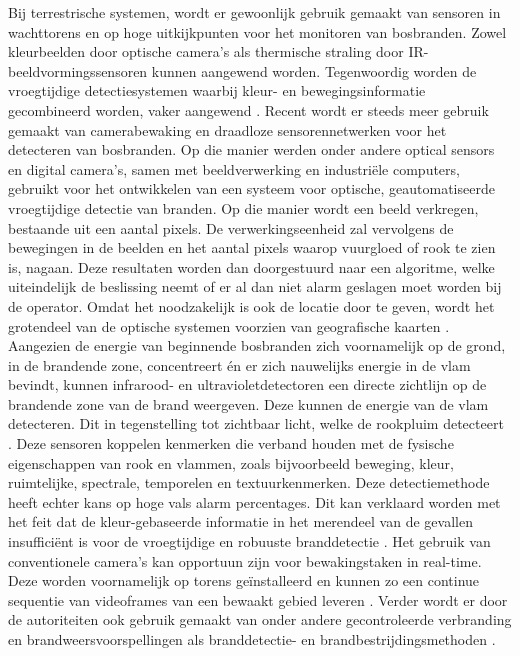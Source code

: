 \documentclass{hogent-article}
\begin{document}
Bij terrestrische systemen, wordt er gewoonlijk gebruik gemaakt van sensoren in wachttorens en op hoge uitkijkpunten voor het monitoren van bosbranden. Zowel kleurbeelden door optische camera’s als thermische straling door IR-beeldvormingssensoren kunnen aangewend worden. Tegenwoordig worden de vroegtijdige detectiesystemen waarbij kleur- en bewegingsinformatie gecombineerd worden, vaker aangewend \autocite{Barmpoutis2020}. 
Recent wordt er steeds meer gebruik gemaakt van camerabewaking en draadloze sensorennetwerken voor het detecteren van bosbranden. Op die manier werden onder andere optical sensors en digital camera’s, samen met beeldverwerking en industriële computers, gebruikt voor het ontwikkelen van een systeem voor optische, geautomatiseerde vroegtijdige detectie van branden. Op die manier wordt een beeld verkregen, bestaande uit een aantal pixels. De verwerkingseenheid zal vervolgens de bewegingen in de beelden en het aantal pixels waarop vuurgloed of rook te zien is, nagaan. Deze resultaten worden dan doorgestuurd naar een algoritme, welke uiteindelijk de beslissing neemt of er al dan niet alarm geslagen moet worden bij de operator. Omdat het noodzakelijk is ook de locatie door te geven, wordt het grotendeel van de optische systemen voorzien van geografische kaarten \autocite{Alkhatib2014}. 
Aangezien de energie van beginnende bosbranden zich voornamelijk op de grond, in de brandende zone, concentreert én er zich nauwelijks energie in de vlam bevindt, kunnen infrarood- en ultravioletdetectoren een directe zichtlijn op de brandende zone van de brand weergeven. Deze kunnen de energie van de vlam detecteren. Dit in tegenstelling tot zichtbaar licht, welke de rookpluim detecteert \autocite{Breejen2001}. Deze sensoren koppelen kenmerken die verband houden met de fysische eigenschappen van rook en vlammen, zoals bijvoorbeeld beweging, kleur, ruimtelijke, spectrale, temporelen en textuurkenmerken. Deze detectiemethode heeft echter kans op hoge vals alarm percentages. Dit kan verklaard worden met het feit dat de kleur-gebaseerde informatie in het merendeel van de gevallen insufficiënt is voor de vroegtijdige en robuuste branddetectie  \autocite{Barmpoutis2020}.
Het gebruik van conventionele camera’s kan opportuun zijn voor bewakingstaken in real-time. Deze worden voornamelijk op torens geïnstalleerd en kunnen zo een continue sequentie van videoframes van een bewaakt gebied leveren \autocite{Cruz2016}. Verder wordt er door de autoriteiten ook gebruik gemaakt van onder andere gecontroleerde verbranding en brandweersvoorspellingen als branddetectie- en brandbestrijdingsmethoden \autocite{Alkhatib2014}.
\end{document}
